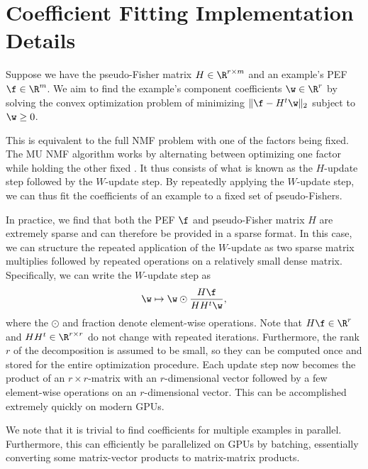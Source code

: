 \documentclass[dvipsnames]{article}
\begin{document}
\section{Coefficient Fitting Implementation Details}\label{sec:coeff_fitting_details}
Suppose we have the pseudo-Fisher matrix $H \in \R^{r\times m}$ and an example's PEF $\f\in\R^m$.
We aim to find the example's component coefficients $\w\in\R^r$ by solving the convex optimization problem of minimizing $\|\f-H^t\w\|_2$ subject to $\w\geq0$.

This is equivalent to the full NMF problem with one of the factors being fixed.
The MU NMF algorithm works by alternating between optimizing one factor while holding the other fixed \citep{boureima2022distributed}.
It thus consists of what is known as the $H$-update step followed by the $W$-update step.
By repeatedly applying the $W$-update step, we can thus fit the coefficients of an example to a fixed set of pseudo-Fishers.

In practice, we find that both the PEF $\f$ and pseudo-Fisher matrix $H$ are extremely sparse and can therefore be provided in a sparse format.
In this case, we can structure the repeated application of the $W$-update as two sparse matrix multiplies followed by repeated operations on a relatively small dense matrix.
Specifically, we can write the $W$-update step as
\begin{equation}\label{eq:appendix_w_update}
    \w \mapsto \w \odot \frac{H\f}{HH^t\w},
\end{equation}
where the $\odot$ and fraction denote element-wise operations.
Note that $H\f \in \R^r$ and $HH^t\in\R^{r\times r}$ do not change with repeated iterations.
Furthermore, the rank $r$ of the decomposition is assumed to be small, so they can be computed once and stored for the entire optimization procedure.
Each update step now becomes the product of an $r\times r$-matrix with an $r$-dimensional vector followed by a few element-wise operations on an $r$-dimensional vector.
This can be accomplished extremely quickly on modern GPUs.

We note that it is trivial to find coefficients for multiple examples in parallel.
Furthermore, this can efficiently be parallelized on GPUs by batching, essentially converting some matrix-vector products to matrix-matrix products.


\end{document}

